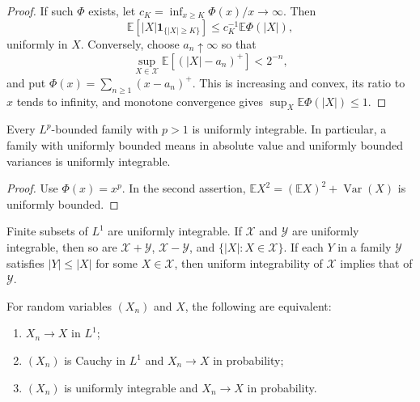 \begin{proof}
If such $\Phi$ exists, let
$c_K=\inf_{x\geq K}\Phi(x)/x\to\infty$. Then
\[
\mathbb E[|X|\mathbf1_{\{|X|\geq K\}}]
 \leq c_K^{-1}\mathbb E\Phi(|X|),
\]
uniformly in $X$. Conversely, choose $a_n\uparrow\infty$ so that
\[
\sup_{X\in\mathcal X}
\mathbb E[(|X|-a_n)^+]<2^{-n},
\]
and put
$\Phi(x)=\sum_{n\geq1}(x-a_n)^+$. This is increasing and convex, its ratio to
$x$ tends to infinity, and monotone convergence gives
$\sup_X\mathbb E\Phi(|X|)\leq1$.
\end{proof}

\begin{cor}
Every $L^p$-bounded family with $p>1$ is uniformly integrable. In particular,
a family with uniformly bounded means in absolute value and uniformly bounded
variances is uniformly integrable.
\end{cor}

\begin{proof}
Use $\Phi(x)=x^p$. In the second assertion,
$\mathbb EX^2=(\mathbb EX)^2+\operatorname{Var}(X)$ is uniformly bounded.
\end{proof}

\begin{prop}
Finite subsets of $L^1$ are uniformly integrable. If $\mathcal X$ and
$\mathcal Y$ are uniformly integrable, then so are
$\mathcal X+\mathcal Y$, $\mathcal X-\mathcal Y$, and
$\{|X|:X\in\mathcal X\}$. If each $Y$ in a family $\mathcal Y$ satisfies
$|Y|\leq|X|$ for some $X\in\mathcal X$, then uniform integrability of
$\mathcal X$ implies that of $\mathcal Y$.
\end{prop}

\begin{thm}
For random variables $(X_n)$ and $X$, the following are equivalent:
\begin{enumerate}[label=(\roman*)]
  \item $X_n\to X$ in $L^1$;
  \item $(X_n)$ is Cauchy in $L^1$ and $X_n\to X$ in probability;
  \item $(X_n)$ is uniformly integrable and $X_n\to X$ in probability.
\end{enumerate}
\end{thm}

